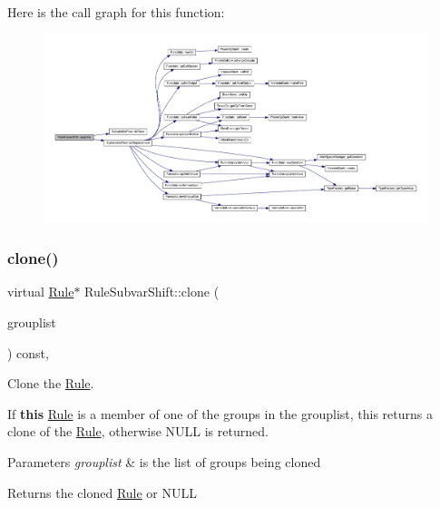Here is the call graph for this function\+:
\nopagebreak
\begin{figure}[H]
\begin{center}
\leavevmode
\includegraphics[width=350pt]{class_rule_subvar_shift_abfeba5a6e02b0d29a5cf98f34d3c3220_cgraph}
\end{center}
\end{figure}
\mbox{\label{class_rule_subvar_shift_ad278c6c03817d7e98c0b7cb06b49bd53}} 
\subsubsection{\texorpdfstring{clone()}{clone()}}
{\footnotesize\ttfamily virtual \mbox{\hyperlink{class_rule}{Rule}}$\ast$ Rule\+Subvar\+Shift\+::clone (\begin{DoxyParamCaption}\item[{const \mbox{\hyperlink{class_action_group_list}{Action\+Group\+List}} \&}]{grouplist }\end{DoxyParamCaption}) const\hspace{0.3cm}{\ttfamily [inline]}, {\ttfamily [virtual]}}



Clone the \mbox{\hyperlink{class_rule}{Rule}}. 

If {\bfseries{this}} \mbox{\hyperlink{class_rule}{Rule}} is a member of one of the groups in the grouplist, this returns a clone of the \mbox{\hyperlink{class_rule}{Rule}}, otherwise N\+U\+LL is returned. 
\begin{DoxyParams}{Parameters}
{\em grouplist} & is the list of groups being cloned \\
\hline
\end{DoxyParams}
\begin{DoxyReturn}{Returns}
the cloned \mbox{\hyperlink{class_rule}{Rule}} or N\+U\+LL 
\end{DoxyReturn}


